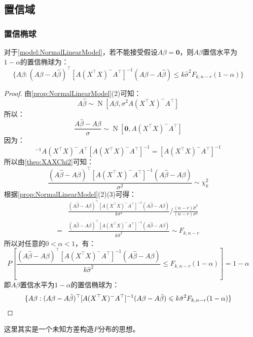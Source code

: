 \subsection{置信域}
\subsubsection{置信椭球}
\begin{theorem}\label{theo:NormalLinearModelConfidenceEllipsoid}
	对于\cref{model:NormalLinearModel}，若不能接受假设$A\beta=\mathbf{0}$，则$A\beta$置信水平为$1-\alpha$的置信椭球为：
	\begin{equation*}
		\{A\beta:(A\beta-A\hat{\beta})^{\top}[A(X^{\top}X)^-A^{\top}]^{-1}(A\beta-A\hat{\beta})\leqslant k\hat{\sigma}^2F_{k,n-r}(1-\alpha)\}
	\end{equation*}
\end{theorem}
\begin{proof}
	由\cref{prop:NormalLinearModel}(2)可知：
	\begin{equation*}
		A\hat{\beta}\sim\operatorname{N}[A\beta,\sigma^2A(X^{\top}X)^-A^{\top}]
	\end{equation*}
	所以：
	\begin{equation*}
		\frac{A\hat{\beta}-A\beta}{\sigma}\sim\operatorname{N}[\mathbf{0},A(X^{\top}X)^-A^{\top}]
	\end{equation*}
	因为：
	\begin{equation*}
		[A(X^{\top}X)^-A^{\top}]^{-1}A(X^{\top}X)^-A^{\top}[A(X^{\top}X)^-A^{\top}]^{-1}=[A(X^{\top}X)^-A^{\top}]^{-1}
	\end{equation*}
	所以由\cref{theo:XAXChi2}可知：
	\begin{equation*}
		\frac{(A\hat{\beta}-A\beta)^{\top}[A(X^{\top}X)^-A^{\top}]^{-1}(A\hat{\beta}-A\beta)}{\sigma^2}\sim\chi_{k}^2
	\end{equation*}
	根据\cref{prop:NormalLinearModel}(2)(3)可得：
	\begin{align*}
		&\frac{(A\hat{\beta}-A\beta)^{\top}[A(X^{\top}X)^-A^{\top}]^{-1}(A\hat{\beta}-A\beta)}{k\sigma^2}\Big/\frac{(n-r)\hat{\sigma}^2}{(n-r)\sigma^2} \\
		=&\frac{(A\hat{\beta}-A\beta)^{\top}[A(X^{\top}X)^-A^{\top}]^{-1}(A\hat{\beta}-A\beta)}{k\hat{\sigma}^2}\sim F_{k,n-r}
	\end{align*}
	所以对任意的$0<\alpha<1$，有：
	\begin{equation*}
		P\left[\frac{(A\hat{\beta}-A\beta)^{\top}[A(X^{\top}X)^-A^{\top}]^{-1}(A\hat{\beta}-A\beta)}{k\hat{\sigma}^2}\leqslant F_{k,n-r}(1-\alpha)\right]=1-\alpha
	\end{equation*}
	即$A\beta$置信水平为$1-\alpha$的置信椭球为：
	\begin{equation*}
		\{A\beta:(A\beta-A\hat{\beta})^{\top}[A(X^{\top}X)^-A^{\top}]^{-1}(A\beta-A\hat{\beta})\leqslant k\hat{\sigma}^2F_{k,n-r}(1-\alpha)\}\qedhere
	\end{equation*}
\end{proof}
\begin{note}
	这里其实是一个未知方差构造$F$分布的思想。
\end{note}
